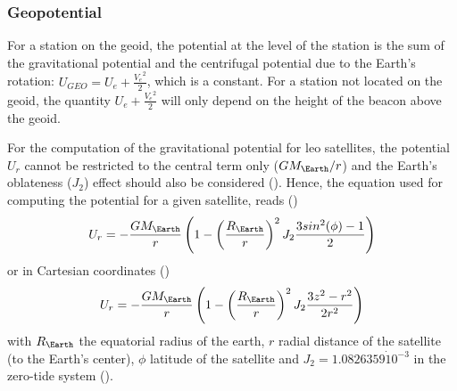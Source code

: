 \subsubsection{Geopotential}\label{sssec:doris-geopotential}
For a station on the geoid, the potential at the level of the station is the sum 
of the gravitational potential and the centrifugal potential due to the Earth's 
rotation: $U_{GEO} = U_e + \frac{{V_e}^2}{2}$, which is a constant. For a station 
not located on the geoid, the quantity $U_e + \frac{{V_e}^2}{2}$ will only depend 
on the height of the beacon above the geoid.

For the computation of the gravitational potential for \gls{leo} satellites, 
the potential $U_r$ cannot be restricted to the central term only ($GM_{\Earth} / r$) and
the Earth's oblateness ($J_2$) effect should also be considered (\cite{Larson2007}). 
Hence, the equation used for computing the potential for a given satellite, reads 
(\cite{Lemoine2016})
\begin{equation}\label{eq:lem18}
  U_r = 
    -\frac{GM_{\Earth}}{r} \left( 
      1 - 
      \left( \frac{R_{\Earth}}{r} \right) ^2 
      J_2 \frac{3 sin^2(\phi) - 1}{2} 
    \right)
\end{equation}
or in Cartesian coordinates (\cite{Larson2007})
\begin{equation}
  U_r = -\frac{GM_{\Earth}}{r} \left( 1- \left(\frac{R_{\Earth}}{r}\right)^2 
    J_2 \frac{3 z^2 - r^2}{2r^2} \right)
\end{equation}
with $R_{\Earth}$ the equatorial radius of the earth, $r$ radial 
distance of the satellite (to the Earth's center), $\phi$ latitude of the 
satellite and $J_2 = 1.0826359 \dot 10^{-3}$ in the zero-tide system (\cite{iers2010}).

\iffalse
\subsubsection{True Proper Frequency of the Receiver}\label{sssec:true-proprtfrequency-of-the-receiver}
For the term $f_{r_T}$ that appears in \autoref{eq:lem13a} and \autoref{eq:lem13b}, we need an estimate of 
$\Delta f_{r} / f_{r_N}$. This estimate can be obtained in one of the following ways 
\cite{Lemoine2016}:
\begin{enumerate}
    \item Via the field ``F'' recorded for every single measurement in the \gls{doris} 
      RINEX file (see \autoref{ssec:relative-frequency-offset}); not that this estimation 
      is not very smooth, as noticed by \cite{Gao2015} and it is advisable, before 
      using it in \autoref{eq:lem13}, to perform a linear (or polynomial) regression of 
      these estimates over one or a few days.
    \item It can be obtained from a polynomial regression over the frequency 
      offsets estimated during the passes over the master beacons
    \item It can be estimated as a by-product during a re-computation of the 
      ``timetagging'' polynomial (see \cite{Mercier2010})
\end{enumerate}
\fi

